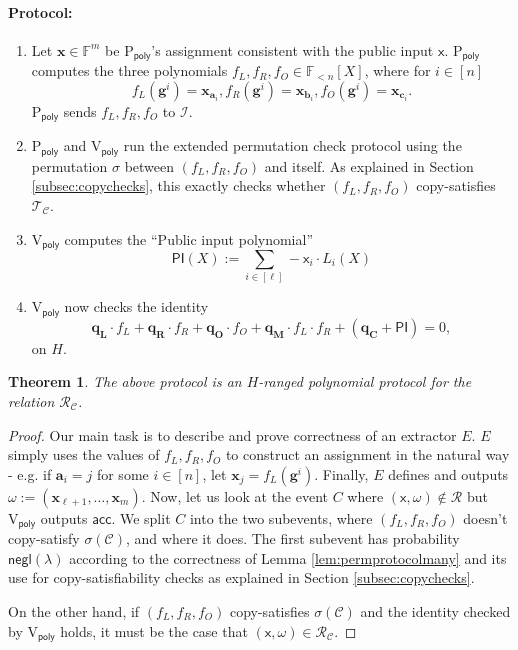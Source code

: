 \documentclass[11pt]{article} %
\newcommand{\F}{\ensuremath{\mathbb F}\xspace}
\newcommand{\sigof}[1]{\ensuremath{\sigma(#1)}\xspace}
\newcommand{\negl}{\ensuremath{\mathsf{negl}(\lambda)}\xspace}
\newcommand{\acc}{\ensuremath{\mathsf{acc}}\xspace}
\newcommand{\defeq}{:=}
\newcommand{\dom}{\ensuremath{H}\xspace}
\newcommand{\partition}{\ensuremath{{\mathcal T}}\xspace}
\newcommand{\partof}[1]{\ensuremath{{\partition_{#1}}}\xspace}
\newcommand{\prvpoly}{\ensuremath{\mathrm{P_{\mathsf{poly}}}}\xspace}
\newcommand{\verpoly}{\ensuremath{\mathrm{V_{\mathsf{poly}}}}\xspace}
\newcommand{\ideal}{\ensuremath{\mathcal{I}}\xspace}
\newcommand{\inp}{\ensuremath{\mathsf{x}}\xspace}
\newcommand{\wit}{\ensuremath{\omega}\xspace}
\newcommand{\rel}{\ensuremath{\mathcal{R}}\xspace}
\newcommand{\ext}{\ensuremath{E}\xspace}
\newcommand{\hgen}{\ensuremath{\mathbf{g}}\xspace}
\newcommand{\polysofdeg}[1]{\ensuremath{\F_{< #1}[X]}\xspace}
\newcommand{\PI}{\ensuremath{\mathsf{PI}}\xspace}
\newcommand{\selleft}{\ensuremath{\mathbf{q_L}}\xspace}
\newcommand{\selright}{\ensuremath{\mathbf{q_R}}\xspace}
\newcommand{\selout}{\ensuremath{\mathbf{q_O}}\xspace}
\newcommand{\selmult}{\ensuremath{\mathbf{q_M}}\xspace}
\newcommand{\selconst}{\ensuremath{\mathbf{q_C}}\xspace}
\newcommand{\lvar}{\ensuremath{\mathbf{a}}\xspace}
\newcommand{\rvar}{\ensuremath{\mathbf{b}}\xspace}
\newcommand{\ovar}{\ensuremath{\mathbf{c}}\xspace}
\newcommand{\assignment}{\ensuremath{\mathbf{x}}\xspace}
\newcommand{\constsystem}{\ensuremath{\mathscr{C}}\xspace}
\newcommand{\relof}[1]{\ensuremath{\rel_{#1}}\xspace}
\newcommand{\pubinppoly}{\ensuremath{\mathsf{PI}}\xspace}
\newtheorem{thm}[lemma]{Theorem}
\begin{document}
\paragraph{Protocol:}

\begin{enumerate}
 \item Let $\assignment\in \F^m$ be \prvpoly's assignment consistent with the public input \inp.
 \prvpoly computes the three polynomials $f_L,f_R,f_O\in \polysofdeg{n}$, where for $i\in [n]$
\[f_L(\hgen^ i)= \assignment_{\lvar_i},f_R(\hgen^i)= \assignment_{\rvar_i},f_O(\hgen^i)= \assignment_{\ovar_i}.\]
\prvpoly sends $f_L,f_R,f_O$ to \ideal.
\item \prvpoly and \verpoly run the extended permutation check protocol using the permutation $\sigma$ between $(f_L,f_R,f_O)$ and itself. As explained in Section \ref{subsec:copychecks}, this exactly checks whether $(f_L,f_R,f_O)$ copy-satisfies \partof{\constsystem}.
\item \verpoly computes the ``Public input polynomial'' 
\[\pubinppoly(X) \defeq \sum_{i\in [\ell]} -\inp_i \cdot L_i(X) \]
\item \verpoly now checks the identity 
\[\selleft \cdot f_L + \selright \cdot f_R + \selout \cdot f_O + \selmult\cdot f_L\cdot f_R+ (\selconst+\PI) =0,\]
on \dom.

\end{enumerate}

\begin{thm}\label{thm:mainprot}
 The above protocol is an  \dom-ranged polynomial protocol for the relation \relof{\constsystem}.
\end{thm}
\begin{proof}
 Our main task is to describe and prove correctness of an extractor \ext.
 \ext simply uses the values of $f_L,f_R,f_O$ to construct an assignment in the natural way - e.g. if $\lvar_i = j$ for some $i\in [n]$, let $\assignment_j = f_L(\hgen^i)$.
 Finally, \ext defines and outputs $\wit \defeq (\assignment_{\ell+1},\ldots,\assignment_m)$.
 Now, let us look at the event  $C$ where $(\inp,\wit)\notin \rel$ but \verpoly outputs \acc.
We split $C$ into the two subevents, where $(f_L,f_R,f_O)$ doesn't copy-satisfy \sigof{\constsystem},
and where it does.
The first subevent has probability \negl according to the correctness of Lemma \ref{lem:permprotocolmany} and its use for copy-satisfiability checks as explained in Section \ref{subsec:copychecks}.

On the other hand, if $(f_L,f_R,f_O)$ copy-satisfies \sigof{\constsystem} and the identity checked by \verpoly holds, it must be the case that $(\inp,\wit)\in \relof{\constsystem}$.
 \end{proof}
\end{document}
